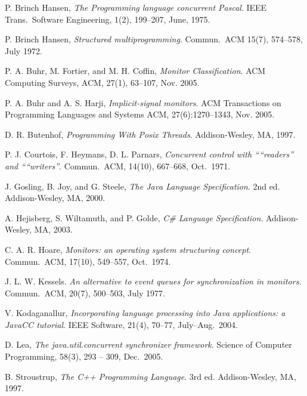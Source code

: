 \documentclass[preprint]{sigplanconf}
\begin{document}
\begin{thebibliography}{}
\softraggedright

  P. Brinch Hansen, \emph{The Programming language concurrent Pascal}. IEEE
  Trans.~Software Engineering, 1(2), 199--207, June, 1975.

    P. Brinch Hansen, \emph{Structured multiprogramming}. Commun.~ACM 15(7),
    574--578, July 1972.

  P. A. Buhr, M. Fortier, and M. H. Coffin, \emph{Monitor Classification}. ACM 
  Computing Surveys, ACM, 27(1), 63--107, 
  Nov. 2005.
  
  P. A. Buhr and A. S. Harji, \emph{Implicit-signal monitors}. ACM 
  Transactions on Programming Languages and Systems ACM, 27(6):1270--1343, 
  Nov. 2005.

  D. R. Butenhof, \emph{Programming With Posix Threads}.
  Addison-Wesley, MA, 1997.

    P. J. Courtois, F. Heymans, D. L. Parnars, \emph{Concurrent control with
    “``readers'' and “``writers''}. Commun.~ACM, 14(10), 667--668, Oct.~1971.

    J. Gosling, B. Joy, and G. Steele, \emph{The Java Language Specification}.
    2nd ed. Addison-Wesley, MA, 2000. 

    A. Hejisberg, S. Wiltamuth, and P. Golde, \emph{C\# Language
    Specification}. Addison-Wesley, MA, 2003.

  C. A. R. Hoare, \emph{Monitors: an operating system structuring concept}. 
  Commun.~ACM, 17(10), 549--557, Oct.~1974. 

    J. L. W. Kessels. \emph{An alternative to event queues for synchronization 
    in monitors}. Commun.~ACM, 20(7), 500--503, July 1977.
  
    V. Kodaganallur, \emph{Incorporating language processing into Java 
    applications: a JavaCC tutorial}. IEEE Software, 21(4), 70--77,
    July--Aug.~2004. 

    D. Lea, \emph{The java.util.concurrent synchronizer framework}. Science of 
    Computer Programming, 58(3), 293 -- 309, Dec.~2005.

    B. Stroustrup, \emph{The C++ Programming Language}. 3rd ed. Addison-Wesley,
    MA, 1997.

\end{thebibliography}
\end{document}
